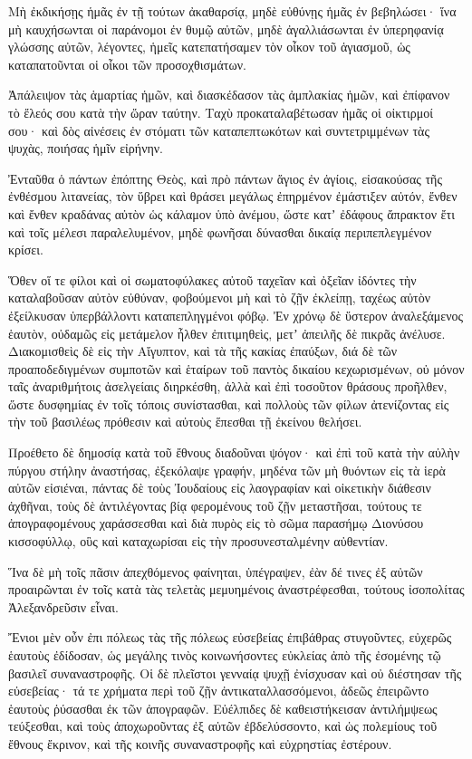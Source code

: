 {Μὴ ἐκδικήσῃς ἡμᾶς ἐν τῇ τούτων ἀκαθαρσίᾳ, μηδὲ εὐθύνῃς ἡμᾶς ἐν βεβηλώσει· ἵνα μὴ καυχήσωνται οἱ παράνομοι ἐν θυμῷ αὐτῶν, μηδὲ ἀγαλλιάσωνται ἐν ὑπερηφανίᾳ γλώσσης αὐτῶν, λέγοντες,
ἡμεῖς κατεπατήσαμεν τὸν οἶκον τοῦ ἁγιασμοῦ, ὡς καταπατοῦνται οἱ οἶκοι τῶν προσοχθισμάτων.
\par }{\PP {}Ἀπάλειψον τὰς ἁμαρτίας ἡμῶν, καὶ διασκέδασον τὰς ἀμπλακίας ἡμῶν, καὶ ἐπίφανον τὸ ἔλεός σου κατὰ τὴν ὥραν ταύτην.
Ταχὺ προκαταλαβέτωσαν ἡμᾶς οἱ οἰκτιρμοί σου· καὶ δὸς αἰνέσεις ἐν στόματι τῶν καταπεπτωκότων καὶ συντετριμμένων τὰς ψυχὰς, ποιήσας ἡμῖν εἰρήνην.
\par }{\PP {}Ἐνταῦθα ὁ πάντων ἐπόπτης Θεὸς, καὶ πρὸ πάντων ἅγιος ἐν ἁγίοις, εἰσακούσας τῆς ἐνθέσμου λιτανείας, τὸν ὕβρει καὶ θράσει μεγάλως ἐπηρμένον ἐμάστιξεν αὐτόν,
ἔνθεν καὶ ἔνθεν κραδάνας αὐτὸν ὡς κάλαμον ὑπὸ ἀνέμου, ὥστε κατʼ ἐδάφους ἄπρακτον ἔτι καὶ τοῖς μέλεσι παραλελυμένον, μηδὲ φωνῆσαι δύνασθαι δικαίᾳ περιπεπλεγμένον κρίσει.
\par }{\PP {}Ὅθεν οἵ τε φίλοι καὶ οἱ σωματοφύλακες αὐτοῦ ταχεῖαν καὶ ὀξεῖαν ἰδόντες τὴν καταλαβοῦσαν αὐτὸν εὐθύναν, φοβούμενοι μὴ καὶ τὸ ζῇν ἐκλείπῃ, ταχέως αὐτὸν ἐξείλκυσαν ὑπερβάλλοντι καταπεπληγμένοι φόβῳ.
Ἐν χρόνῳ δὲ ὕστερον ἀναλεξάμενος ἑαυτὸν, οὐδαμῶς εἰς μετάμελον ἦλθεν ἐπιτιμηθεὶς, μετʼ ἀπειλῆς δὲ πικρᾶς ἀνέλυσε.
Διακομισθεὶς δὲ εἰς τὴν Αἴγυπτον, καὶ τὰ τῆς κακίας ἐπαύξων, διά δὲ τῶν προαποδεδιγμένων συμποτῶν καὶ ἑταίρων τοῦ παντὸς δικαίου κεχωρισμένων,
οὐ μόνον ταῖς ἀναριθμήτοις ἀσελγείαις διηρκέσθη, ἀλλὰ καὶ ἐπὶ τοσοῦτον θράσους προῆλθεν, ὥστε δυσφημίας ἐν τοῖς τόποις συνίστασθαι, καὶ πολλοὺς τῶν φίλων ἀτενίζοντας εἰς τὴν τοῦ βασιλέως πρόθεσιν καὶ αὐτοὺς ἕπεσθαι τῇ ἐκείνου θελήσει.
\par }{\PP {}Προέθετο δὲ δημοσίᾳ κατὰ τοῦ ἔθνους διαδοῦναι ψόγον· καὶ ἐπὶ τοῦ κατὰ τὴν αὐλὴν πύργου στήλην ἀναστήσας, ἐξεκόλαψε γραφήν,
μηδένα τῶν μὴ θυόντων εἰς τὰ ἱερὰ αὐτῶν εἰσιέναι, πάντας δὲ τοὺς Ἰουδαίους εἰς λαογραφίαν καὶ οἰκετικὴν διάθεσιν ἀχθῆναι, τοὺς δὲ ἀντιλέγοντας βίᾳ φερομένους τοῦ ζῇν μεταστῆσαι,
τούτους τε ἀπογραφομένους χαράσσεσθαι καὶ διὰ πυρὸς εἰς τὸ σῶμα παρασήμῳ Διονύσου κισσοφύλλῳ, οὓς καὶ καταχωρίσαι εἰς τὴν προσυνεσταλμένην αὐθεντίαν.
\par }{\PP {}Ἵνα δὲ μὴ τοῖς πᾶσιν ἀπεχθόμενος φαίνηται, ὑπέγραψεν, ἐὰν δέ τινες ἐξ αὐτῶν προαιρῶνται ἐν τοῖς κατὰ τὰς τελετὰς μεμυημένοις ἀναστρέφεσθαι, τούτους ἰσοπολίτας Ἀλεξανδρεῦσιν εἶναι.
\par }{\PP {}Ἔνιοι μὲν οὖν ἐπι πόλεως τὰς τῆς πόλεως εὐσεβείας ἐπιβάθρας στυγοῦντες, εὐχερῶς ἑαυτοὺς ἐδίδοσαν, ὡς μεγάλης τινὸς κοινωνήσοντες εὐκλείας ἀπὸ τῆς ἐσομένης τῷ βασιλεῖ συναναστροφῆς.
Οἱ δὲ πλεῖστοι γενναίᾳ ψυχῇ ἐνίσχυσαν καὶ οὐ διέστησαν τῆς εὐσεβείας· τά τε χρήματα περὶ τοῦ ζῇν ἀντικαταλλασσόμενοι, ἀδεῶς ἐπειρῶντο ἑαυτοὺς ῥύσασθαι ἐκ τῶν ἀπογραφῶν.
Εὐέλπιδες δὲ καθειστήκεισαν ἀντιλήμψεως τεύξεσθαι, καὶ τοὺς ἀποχωροῦντας ἐξ αὐτῶν ἐβδελύσσοντο, καὶ ὡς πολεμίους τοῦ ἔθνους ἔκρινον, καὶ τῆς κοινῆς συναναστροφῆς καὶ εὐχρηστίας ἐστέρουν.

}
